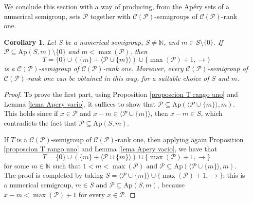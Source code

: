 \documentclass[11pt]{article}
\def\N{\mathbb{N}}
\newtheorem{corollary}[theorem]{Corollary}
\numberwithin{equation}{section}
\newcommand{\CP}{\mathcal C(\mathcal P)}
\newcommand{\Ap}{\mathrm{Ap}}
\begin{document}
We conclude this section with a way of producing, from the Ap\'ery sets of a numerical semigroup, sets $\mathcal P$ together with $\CP$-semigroups of $\CP$-rank one.

\begin{corollary}\label{corolario algoritmo}
    Let $S$ be a numerical semigroup, $S\ne\N$, and $m\in S\setminus\{0\}$. If $\mathcal P\subseteq\mathrm{Ap}(S,m)\setminus\{0\}$ and $m<\max(\mathcal P)$, then
    \[
    T=\{0\}\cup(\{m\}+\langle\mathcal P\cup\{m\}\rangle)\cup\{\max(\mathcal P)+1,\rightarrow\}
    \]
    is a $\mathcal C(\mathcal P)$-semigroup of $\mathcal C(\mathcal P)$-rank one. Moreover, every $\mathcal C(\mathcal P)$-semigroup of $\mathcal C(\mathcal P)$-rank one can be obtained in this way, for a suitable choice of $S$ and $m$.
\end{corollary}

\begin{proof}
    To prove the first part, using Proposition \ref{proposcion T rango uno} and Lemma \ref{lema Apery vacio}, it suffices to show that $\mathcal P\subseteq\mathrm{Ap}(\langle\mathcal P\cup\{m\}\rangle,m)$. This holds since if $x\in\mathcal P$ and $x-m\in\langle\mathcal P\cup\{m\}\rangle$, then $x-m\in S$, which contradicts the fact that $\mathcal P\subseteq\mathrm{Ap}(S,m)$.

    If $T$ is a $\mathcal C(\mathcal P)$-semigroup of $\mathcal C(\mathcal P)$-rank one, then applying again Proposition \ref{proposcion T rango uno} and Lemma \ref{lema Apery vacio}, we have that
    \[
    T=\{0\}\cup(\{m\}+\langle\mathcal P\cup\{m\}\rangle)\cup\{\max(\mathcal P)+1,\rightarrow\}
    \]
    for some $m\in\N$ such that $1<m<\max(\mathcal P)$ and $\mathcal P\subseteq\mathrm{Ap}(\langle\mathcal P\cup\{m\}\rangle,m)$. The proof is completed by taking $S=\langle\mathcal P\cup\{m\}\rangle\cup\{\max(\mathcal P)+1,\rightarrow\}$; this is a numerical semigroup, $m\in S$ and $\mathcal P\subseteq\Ap(S,m)$, because $x-m<\max(\mathcal P)+1$ for every $x\in\mathcal P$.
\end{proof}
\end{document}
